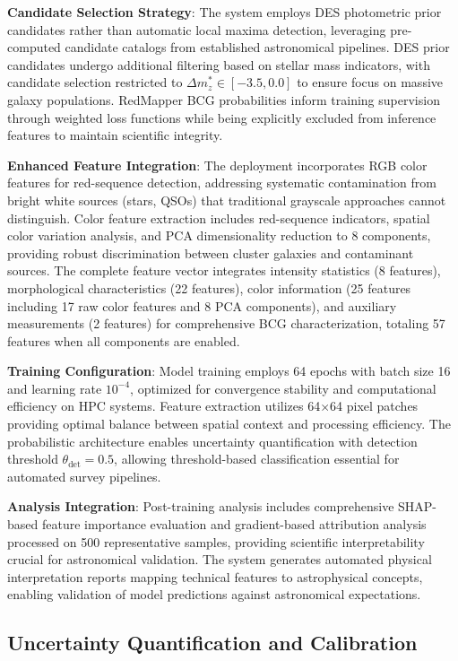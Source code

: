 \documentclass[twocolumn,10pt]{aastex631}
\begin{document}
\textbf{Candidate Selection Strategy}: The system employs DES photometric prior candidates rather than automatic local maxima detection, leveraging pre-computed candidate catalogs from established astronomical pipelines. DES prior candidates undergo additional filtering based on stellar mass indicators, with candidate selection restricted to $\Delta m^*_z \in [-3.5, 0.0]$ to ensure focus on massive galaxy populations. RedMapper BCG probabilities inform training supervision through weighted loss functions while being explicitly excluded from inference features to maintain scientific integrity.

\textbf{Enhanced Feature Integration}: The deployment incorporates RGB color features for red-sequence detection, addressing systematic contamination from bright white sources (stars, QSOs) that traditional grayscale approaches cannot distinguish. Color feature extraction includes red-sequence indicators, spatial color variation analysis, and PCA dimensionality reduction to 8 components, providing robust discrimination between cluster galaxies and contaminant sources. The complete feature vector integrates intensity statistics (8 features), morphological characteristics (22 features), color information (25 features including 17 raw color features and 8 PCA components), and auxiliary measurements (2 features) for comprehensive BCG characterization, totaling 57 features when all components are enabled.

\textbf{Training Configuration}: Model training employs 64 epochs with batch size 16 and learning rate $10^{-4}$, optimized for convergence stability and computational efficiency on HPC systems. Feature extraction utilizes 64×64 pixel patches providing optimal balance between spatial context and processing efficiency. The probabilistic architecture enables uncertainty quantification with detection threshold $\theta_{\text{det}} = 0.5$, allowing threshold-based classification essential for automated survey pipelines.

\textbf{Analysis Integration}: Post-training analysis includes comprehensive SHAP-based feature importance evaluation and gradient-based attribution analysis processed on 500 representative samples, providing scientific interpretability crucial for astronomical validation. The system generates automated physical interpretation reports mapping technical features to astrophysical concepts, enabling validation of model predictions against astronomical expectations.

\subsection{Uncertainty Quantification and Calibration}
\end{document}
